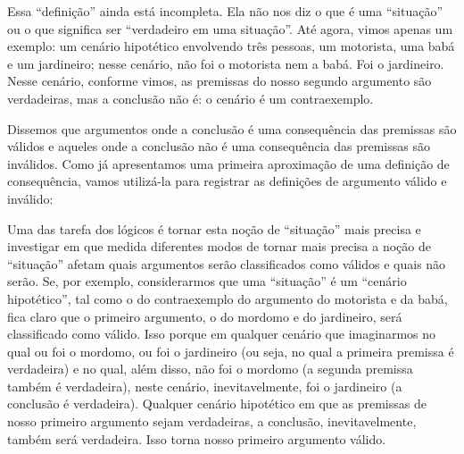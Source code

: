Essa ``definição'' ainda está incompleta. Ela não nos diz o que é uma ``situação'' ou o que significa ser ``verdadeiro em uma situação''.
Até agora, vimos apenas um exemplo:
um cenário hipotético envolvendo três pessoas, um motorista, uma babá e um jardineiro; nesse cenário, não foi o motorista nem a babá. Foi o jardineiro. Nesse cenário, conforme vimos, as premissas do nosso segundo argumento são verdadeiras, mas a conclusão não é:
o cenário é um contraexemplo.

Dissemos que argumentos onde a conclusão é uma consequência das premissas são válidos e aqueles onde a conclusão não é uma consequência das premissas são inválidos.
Como já apresentamos uma primeira aproximação de uma definição de consequência, vamos utilizá-la para registrar as definições de argumento válido e inválido:





Uma das tarefa dos lógicos é tornar esta noção de ``situação'' mais precisa e investigar em que medida diferentes modos de tornar mais precisa a noção de ``situação'' afetam quais argumentos serão classificados como válidos e quais não serão. 
Se, por exemplo, considerarmos que uma ``situação'' é um ``cenário hipotético'', tal como o do contraexemplo do argumento do motorista e da babá, fica claro que o primeiro argumento, o do mordomo e do jardineiro, será classificado como válido.
Isso porque em qualquer cenário que imaginarmos no qual ou foi o mordomo, ou foi o jardineiro (ou seja, no qual a primeira premissa é verdadeira) e no qual, além disso, não foi o mordomo (a segunda premissa também é verdadeira), neste cenário, inevitavelmente, foi o jardineiro (a conclusão é verdadeira).
Qualquer cenário hipotético em que as premissas de nosso primeiro argumento sejam verdadeiras, a conclusão, inevitavelmente, também será verdadeira.
Isso torna nosso primeiro argumento válido.

